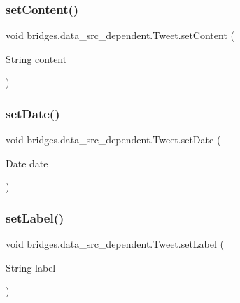 \hypertarget{classbridges_1_1data__src__dependent_1_1_tweet_a80ac618b5817392ce356657b2bf4145a}{}\label{classbridges_1_1data__src__dependent_1_1_tweet_a80ac618b5817392ce356657b2bf4145a} 
\subsubsection{\texorpdfstring{set\+Content()}{setContent()}}
{\footnotesize\ttfamily void bridges.\+data\+\_\+src\+\_\+dependent.\+Tweet.\+set\+Content (\begin{DoxyParamCaption}\item[{String}]{content }\end{DoxyParamCaption})}

\hypertarget{classbridges_1_1data__src__dependent_1_1_tweet_a1a57c028bb87ad4e94af496a7260ffe9}{}\label{classbridges_1_1data__src__dependent_1_1_tweet_a1a57c028bb87ad4e94af496a7260ffe9} 
\subsubsection{\texorpdfstring{set\+Date()}{setDate()}}
{\footnotesize\ttfamily void bridges.\+data\+\_\+src\+\_\+dependent.\+Tweet.\+set\+Date (\begin{DoxyParamCaption}\item[{Date}]{date }\end{DoxyParamCaption})}

\hypertarget{classbridges_1_1data__src__dependent_1_1_tweet_aa193633f4f61cc957f05a1c551f18822}{}\label{classbridges_1_1data__src__dependent_1_1_tweet_aa193633f4f61cc957f05a1c551f18822} 
\subsubsection{\texorpdfstring{set\+Label()}{setLabel()}}
{\footnotesize\ttfamily void bridges.\+data\+\_\+src\+\_\+dependent.\+Tweet.\+set\+Label (\begin{DoxyParamCaption}\item[{String}]{label }\end{DoxyParamCaption})}

